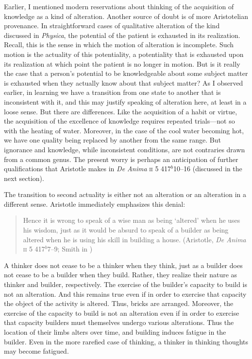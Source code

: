 Earlier, I mentioned modern reservations about thinking of the acquisition of knowledge as a kind of alteration. Another source of doubt is of more Aristotelian provenance. In straightforward cases of qualitative alteration of the kind discussed in \emph{Physica}, the potential of the patient is exhausted in its realization. Recall, this is the sense in which the motion of alteration is incomplete. Such motion is the actuality of this potentiality, a potentiality that is exhausted upon its realization at which point the patient is no longer in motion. But is it really the case that a person's potential to be knowledgeable about some subject matter is exhausted when they actually know about that subject matter? As I observed earlier, in learning we have a transition from one state to another that is inconsistent with it, and this may justify speaking of alteration here, at least in a loose sense. But there are differences. Like the acquisition of a habit or virtue, the acquisition of the excellence of knowledge requires repeated trials---not so with the heating of water. Moreover, in the case of the cool water becoming hot, we have one quality being replaced by another from the same range. But ignorance and knowledge, while inconsistent conditions, are not contraries drawn from a common genus. The present worry is perhaps an anticipation of further qualifications that Aristotle makes in \emph{De Anima} \textsc{ii} 5 417\( ^{b} \)10--16 (discussed in the next section).

The transition to second actuality is either not an alteration or an alteration in a different sense. Aristotle immediately emphasizes this denial:
\begin{quote}
	Hence it is wrong to speak of a wise man as being `altered' when he uses his wisdom, just as it would be absurd to speak of a builder as being altered when he is using his skill in building a house. (Aristotle, \emph{De Anima} \textsc{ii} 5 417\( ^{b} \)7--9; Smith in \citealt[30]{Barnes:1984uq})
\end{quote}
A thinker does not cease to be a thinker when they think, just as a builder does not cease to be a builder when they build. Rather, they realize their nature as thinker and builder, respectively. The exercise of the builder's capacity to build is not an alteration. And this remains true even if in order to exercise that capacity the object of the activity is altered. Thus, bricks are arranged. Moreover, the exercise of the capacity to build is not an alteration even if in order to exercise that capacity builders must themselves undergo various alterations. Thus the location of their limbs alters over time, and building induces fatigue in the builder. Even in the more rarefied case of thinking, a thinker in thinking thoughts may become fatigued.

